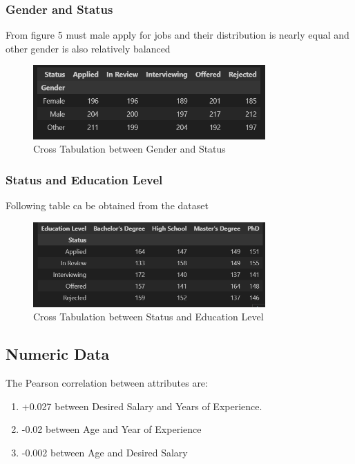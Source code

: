 \documentclass[lettersize,journal]{IEEEtran}
\begin{document}
\subsubsection{Gender and Status}

From figure 5 must male apply for jobs and their
distribution is nearly equal and other gender is also relatively
balanced

\begin{figure}[h]
\centering
\includegraphics[width=3.5in]{Screenshot 2023-09-08 160134.png}
\caption{Cross Tabulation between Gender and Status}
\label{fig_5}
\end{figure}

\subsubsection{Status and Education Level}
Following table ca be obtained from the dataset 
\begin{figure}[h]
\centering
\includegraphics[width=3.5in]{Screenshot 2023-09-08 160141.png}
\caption{Cross Tabulation between Status and Education Level}
\label{fig_6}
\end{figure}
\pagebreak
\subsection{Numeric Data}
The Pearson correlation between attributes are:
\begin{enumerate}
    \item{ +0.027 between Desired Salary and Years of Experience.}
    \item{-0.02 between Age and Year of Experience}
    \item{-0.002 between Age and Desired Salary}
\end{enumerate}
    
\end{document}
